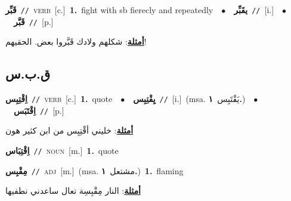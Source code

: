\documentclass[10pt,a4paper,twoside]{article} %
\begin{document}
\begin{multicols}{2}
{{{{{\setlength\topsep{0pt}\textbf{\foreignlanguage{arabic}{قَبِّر}}\ {\color{gray}\texttt{//}\color{black}}\ \textsc{verb}\ [c.]\ \textbf{1.}~fight with sb fierecly and repeatedly\ \ $\bullet$\ \ \setlength\topsep{0pt}\textbf{\foreignlanguage{arabic}{يقَبِّر}}\ {\color{gray}\texttt{//}\color{black}}\ [i.]\ \ $\bullet$\ \ \setlength\topsep{0pt}\textbf{\foreignlanguage{arabic}{قَبَّر}}\ {\color{gray}\texttt{//}\color{black}}\ [p.]\  \begin{flushright}\color{gray}\foreignlanguage{arabic}{\textbf{\underline{\foreignlanguage{arabic}{أمثلة}}}: شكلهم ولادك قَبَّروا بعض. الحقيهم!}\end{flushright}\color{black}} \vspace{2mm}

\vspace{-3mm}
\subsection*{\color{blue}\foreignlanguage{arabic}{ق.ب.س}\color{blue}{}} 

{\setlength\topsep{0pt}\textbf{\foreignlanguage{arabic}{اِقْتِبِس}}\ {\color{gray}\texttt{//}\color{black}}\ \textsc{verb}\ [c.]\ \textbf{1.}~quote\ \ $\bullet$\ \ \setlength\topsep{0pt}\textbf{\foreignlanguage{arabic}{يِقْتِبِس}}\ {\color{gray}\texttt{//}\color{black}}\ [i.]\ \color{gray}(msa. \foreignlanguage{arabic}{يَقْتَبِس}~\foreignlanguage{arabic}{\textbf{١.}})\color{black}\ \ $\bullet$\ \ \setlength\topsep{0pt}\textbf{\foreignlanguage{arabic}{اِقْتَبَس}}\ {\color{gray}\texttt{//}\color{black}}\ [p.]\  \begin{flushright}\color{gray}\foreignlanguage{arabic}{\textbf{\underline{\foreignlanguage{arabic}{أمثلة}}}: خليني أقْتِبِس من ابن كثير هون}\end{flushright}\color{black}} \vspace{2mm}

{\setlength\topsep{0pt}\textbf{\foreignlanguage{arabic}{اِقْتِبَاس}}\ {\color{gray}\texttt{//}\color{black}}\ \textsc{noun}\ [m.]\ \textbf{1.}~quote\ 

{\setlength\topsep{0pt}\textbf{\foreignlanguage{arabic}{مِقْبِس}}\ {\color{gray}\texttt{//}\color{black}}\ \textsc{adj}\ [m.]\ \color{gray}(msa. \foreignlanguage{arabic}{مشتعل}~\foreignlanguage{arabic}{\textbf{١.}})\color{black}\ \textbf{1.}~flaming\  \begin{flushright}\color{gray}\foreignlanguage{arabic}{\textbf{\underline{\foreignlanguage{arabic}{أمثلة}}}: النار مِقْبِسِة تعال ساعدني نطفيها}\end{flushright}\color{black}} \vspace{2mm}

}}}}}
\end{multicols}
\end{document}
